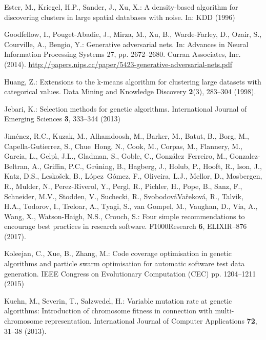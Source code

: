 \documentclass[smallextended]{svjour3}
\begin{document}
\begin{thebibliography}{10}
Ester, M., Kriegel, H.P., Sander, J., Xu, X.: A density-based algorithm for
  discovering clusters in large spatial databases with noise.
\newblock In: KDD (1996)

Goodfellow, I., Pouget-Abadie, J., Mirza, M., Xu, B., Warde-Farley, D., Ozair,
  S., Courville, A., Bengio, Y.: Generative adversarial nets.
\newblock In: Advances in Neural Information Processing Systems 27, pp.
  2672--2680. Curran Associates, Inc. (2014).
\newblock
  \urlprefix\url{http://papers.nips.cc/paper/5423-generative-adversarial-nets.pdf}

Huang, Z.: Extensions to the k-means algorithm for clustering large datasets
  with categorical values.
\newblock Data Mining and Knowledge Discovery \textbf{2}(3), 283--304 (1998).
\newblock {}

Jebari, K.: Selection methods for genetic algorithms.
\newblock International Journal of Emerging Sciences \textbf{3}, 333--344
  (2013)

Jim{\'e}nez, R.C., Kuzak, M., Alhamdoosh, M., Barker, M., Batut, B., Borg, M.,
  Capella-Gutierrez, S., Chue~Hong, N., Cook, M., Corpas, M., Flannery, M.,
  Garcia, L., Gelp{\'\i}, J.L., Gladman, S., Goble, C., Gonz{\'a}lez~Ferreiro,
  M., Gonzalez-Beltran, A., Griffin, P.C., Gr{\"u}ning, B., Hagberg, J., Holub,
  P., Hooft, R., Ison, J., Katz, D.S., Lesko{\v s}ek, B., L{\'o}pez~G{\'o}mez,
  F., Oliveira, L.J., Mellor, D., Mosbergen, R., Mulder, N., Perez-Riverol, Y.,
  Pergl, R., Pichler, H., Pope, B., Sanz, F., Schneider, M.V., Stodden, V.,
  Suchecki, R., Svobodov{\'a}Va{\v r}ekov{\'a}, R., Talvik, H.A., Todorov, I.,
  Treloar, A., Tyagi, S., van Gompel, M., Vaughan, D., Via, A., Wang, X.,
  Watson-Haigh, N.S., Crouch, S.: Four simple recommendations to encourage best
  practices in research software.
\newblock F1000Research \textbf{6}, ELIXIR--876 (2017).
\newblock {}

Koleejan, C., Xue, B., Zhang, M.: Code coverage optimisation in genetic
  algorithms and particle swarm optimisation for automatic software test data
  generation.
 IEEE Congress on Evolutionary Computation (CEC) pp. 1204--1211
  (2015)

Kuehn, M., Severin, T., Salzwedel, H.: Variable mutation rate at genetic
  algorithms: Introduction of chromosome fitness in connection with
  multi-chromosome representation.
\newblock International Journal of Computer Applications \textbf{72}, 31--38
  (2013).
\newblock {}


\end{thebibliography}
\end{document}

